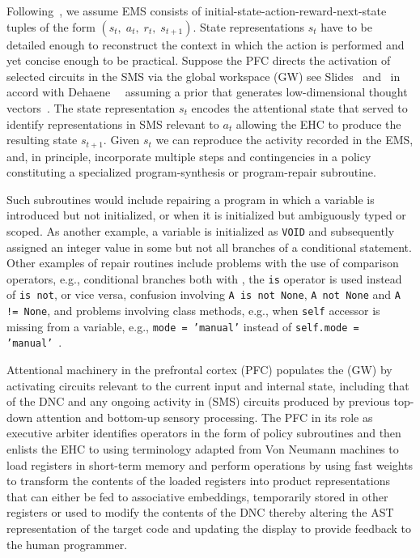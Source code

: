 Following~\cite{PritzeletalICML-17}, we assume EMS consists of initial-state-action-reward-next-state tuples of the form $(s_{t},\;a_{t},\;r_{t},\;s_{t+1})$. State representations $s_{t}$ have to be detailed enough to reconstruct the context in which the action is performed and yet concise enough to be practical. Suppose the PFC directs the activation of selected circuits in the SMS via the global workspace (GW) \emdash{} see Slides~{{}} and~{{}} \emdash{} in accord with Dehaene~\etal{}~\cite{DehaeneetalSCIENCE-17,Dehaene2014} assuming a prior that generates low-dimensional thought vectors~\cite{BengioCoRR-17}. The state representation $s_{t}$ encodes the attentional state that served to identify representations in SMS relevant to $a_{t}$ allowing the EHC to produce the resulting state $s_{t+1}$. Given $s_{t}$ we can reproduce the activity recorded in the EMS, and, in principle, incorporate multiple steps and contingencies in a policy constituting a specialized program-synthesis or program-repair subroutine.

Such subroutines would include repairing a program in which a variable is introduced but not initialized, or when it is initialized but ambiguously typed or scoped. As another example, a variable is initialized as {\tt{VOID}} and subsequently assigned an integer value in some but not all branches of a conditional statement. Other examples of repair routines include problems with the use of comparison operators, e.g., conditional branches both with \hmleq{}, the {\tt{is}} operator is used instead of {\tt{is not}}, or vice versa, confusion involving {\tt{A is not None}}, {\tt{A not None}} and {\tt{A != None}}, and problems involving class methods, e.g., when {\tt{self}} accessor is missing from a variable, e.g., {\tt{mode = 'manual'}} instead of {\tt{self.mode = 'manual'}}~\cite{ShinetalICLR-18b,DevlinetalICLR-18,WangetalCoRR-17}.

Attentional machinery in the prefrontal cortex (PFC) populates the (GW) by activating circuits relevant to the current input and internal state, including that of the DNC and any ongoing activity in (SMS) circuits produced by previous top-down attention and bottom-up sensory processing. The PFC in its role as executive arbiter identifies operators in the form of policy subroutines and then enlists the EHC to \emdash{} using terminology adapted from Von Neumann machines \emdash{} to load registers in short-term memory and perform operations by using fast weights to transform the contents of the loaded registers into product representations that can either be fed to associative embeddings, temporarily stored in other registers or used to modify the contents of the DNC thereby altering the AST representation of the target code and updating the display to provide feedback to the human programmer.

